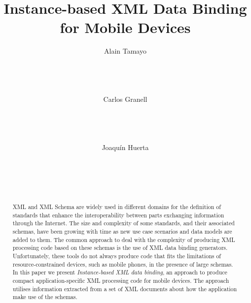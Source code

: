 \documentclass{sig-alternate}
\begin{document}

\title{Instance-based XML Data Binding for Mobile Devices}

\author{
\alignauthor
Alain Tamayo\\
       \\
       \\
       \\
       \\
\alignauthor
Carlos Granell\\
      \\
       \\
       \\
       \\
\alignauthor 
Joaqu\'in Huerta\\
      \\
       \\
       \\
       \\
}





\maketitle

\begin{abstract}

XML and XML Schema are widely used in different domains for the definition of standards that enhance the interoperability between parts exchanging information through the Internet. 
The size and complexity of some standards, and their associated schemas, have been growing with time as new use case scenarios and data models are added to them. 
The common approach to deal with the complexity of producing XML processing code based on these schemas is the use of XML data binding generators. 
Unfortunately, these tools do not always produce code that fits the limitations of resource-constrained devices, such as mobile phones, in the presence of large schemas. 
In this paper we present \textit{Instance-based XML data binding}, an approach to produce compact application-specific XML processing code for mobile devices. 
The approach utilises information extracted from a set of XML documents about how the application make use of the schemas. 
\end{abstract}
\end{document}
